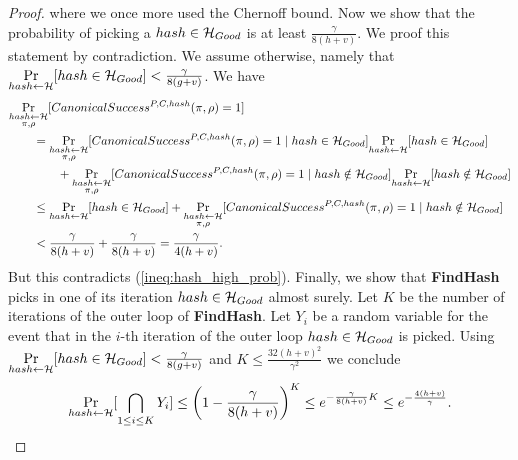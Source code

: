 \begin{proof}
where we once more used the Chernoff bound.
Now we show that the probability of picking a $hash \in \mathcal{H}_{Good}$ is at least $\frac{\gamma}{8(h+v)}$.
We proof this statement by contradiction. We assume otherwise, namely that
$\underset{hash \leftarrow \mathcal{H}}{\Pr}[hash \in \mathcal{H}_{Good}] < \frac{\gamma}{8(g+v)}$.
We have
\begin{align*}
  &\underset{\substack{hash \leftarrow \mathcal{H} \\ \pi, \rho}}{\Pr}[CanonicalSuccess^{P,C,hash}(\pi, \rho) = 1] \\
  &\mbox\qquad = \underset{\substack{hash \leftarrow \mathcal{H} \\ \pi, \rho}}{\Pr}[CanonicalSuccess^{P,C,hash}(\pi, \rho) = 1 \mid hash \in \mathcal{H}_{Good}]
  \underset{hash \leftarrow \mathcal{H}}{\Pr}[hash \in \mathcal{H}_{Good}] \\
  & \mbox\qquad\qquad + \underset{\substack{hash \leftarrow \mathcal{H} \\ \pi, \rho}}{\Pr}[CanonicalSuccess^{P,C,hash}(\pi, \rho) = 1 \mid hash \notin \mathcal{H}_{Good}]
  \underset{hash \leftarrow \mathcal{H}}{\Pr}[hash \notin \mathcal{H}_{Good}] \\
  & \mbox\qquad \leq \underset{hash \leftarrow \mathcal{H}}{\Pr}[hash \in \mathcal{H}_{Good}] +
  \underset{\substack{hash \leftarrow \mathcal{H} \\ \pi, \rho}}{\Pr}[CanonicalSuccess^{P,C,hash}(\pi, \rho) = 1 \mid hash \notin \mathcal{H}_{Good}] \\
  & \mbox\qquad < \frac{\gamma}{8(h+v)} + \frac{\gamma}{8(h+v)} = \frac{\gamma}{4(h+v)}.
\end{align*}
But this contradicts (\ref{ineq:hash_high_prob}).
Finally, we show that \textbf{FindHash} picks in one of its iteration $hash \in \mathcal{H}_{Good}$ almost surely.
Let $K$ be the number of iterations of the outer loop of \textbf{FindHash}.
Let $Y_i$ be a random variable for the event
that in the $i$-th iteration of the outer loop $hash \in \mathcal{H}_{Good}$ is picked.
Using $\underset{hash \leftarrow \mathcal{H}}{\Pr}[hash \in \mathcal{H}_{Good}] < \frac{\gamma}{8(g+v)}$ and  $K \leq \frac{32(h+v)^2}{\gamma^2}$ we conclude
\begin{align*}
  \underset{hash \leftarrow \mathcal{H}}{\Pr}[ \bigcap_{1 \leq i \leq K} Y_i ] \leq \left(1 - \frac{\gamma}{8(h+v)}\right)^{K}
    \leq e^{-\frac{\gamma}{8(h+v)} K}
    \leq e^{-\frac{4(h+v)}{\gamma}}.
\end{align*}
\end{proof}
